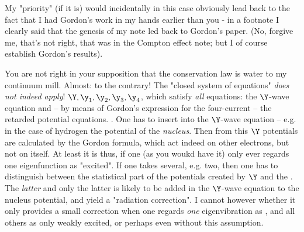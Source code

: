 \documentclass{article}
\begin{document}
My  "priority" (if it is) would incidentally in this case obviously lead back to the fact that I had Gordon's work in my hands earlier than you - in a footnote I clearly said that the genesis of my note led back to Gordon's paper. (No, forgive me, that's not right, that was in the Compton effect note; but I of course  establish Gordon's results).

You are not right in your supposition that the conservation law is water to my continuum mill. Almost: to the contrary! The "closed system of equations" \textit{does not indeed apply}!  $\Y,\y_1,\y_2,\y_3,\y_4$, which satisfy \textit{all} equations: the $\Y$-wave equation and -- by means of Gordon's expression for the four-current -- the retarded potential equations. \textit{}. One has to insert into the $\Y$-wave equation -- e.g. in the case of hydrogen the potential of the \textit{nucleus}. Then from this $\Y$ potentials are calculated by the Gordon formula, which act indeed on other electrons, but not on itself. At least it is thus, if one (as you woukd have it) only ever regards one eigenfunction as "excited". If one takes several, e.g. two, then one has to distinguish between the statistical part of the potentials created by $\Y$ and the . The \textit{latter} and only the latter is likely to be added in the $\Y$-wave equation to the nucleus potential, and yield a "radiation correction". I cannot however  whether it only provides a small correction when one regards \textit{one} eigenvibration as , and all others as only weakly excited, or perhaps even without this assumption.
\end{document}
